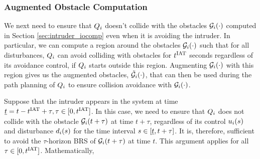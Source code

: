 %
%

\subsubsection{Augmented Obstacle Computation} \label{sec:intruder_aocomp}
We next need to ensure that $Q_i$ doesn't collide with the obstacles $\mathcal{G}_i(\cdot)$ computed in Section \ref{sec:intruder_iocomp} even when it is avoiding the intruder. In particular, we can compute a region around the obstacles $\mathcal{G}_i(\cdot)$ such that for all disturbances, $Q_i$ can avoid colliding with obstacles for $t^\text{IAT}$ seconds regardless of its avoidance control, if $Q_i$ starts outside this region. Augmenting $\mathcal{G}_i(\cdot)$ with this region gives us the augmented obstacles, $\tilde{\mathcal{G}}_i(\cdot)$, that can then be used during the path planning of $Q_i$ to ensure collision avoidance with $\mathcal{G}_i(\cdot)$.  

Suppose that the intruder appears in the system at time $\underline{t} = t - t^\text{IAT} + \tau, \tau \in [0, t^\text{IAT}]$. In this case, we need to ensure that $Q_i$ does not collide with the obstacle $\mathcal{G}_i(t + \tau)$ at time $t + \tau$, regardless of its control $u_i(s)$ and disturbance $d_i(s)$ for the time interval $s \in [\underline{t}, t + \tau]$. It is, therefore, sufficient to avoid the $\tau$-horizon BRS of $\mathcal{G}_i(t + \tau)$ at time $t$. This argument applies for all $\tau \in [0, t^\text{IAT}]$. Mathematically,

